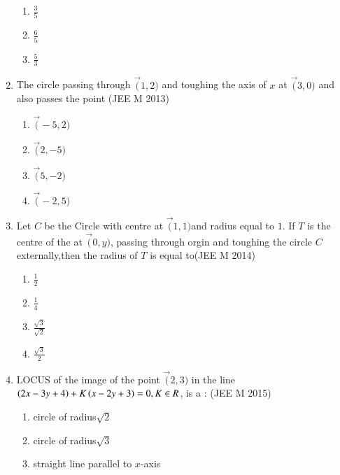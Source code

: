 \documentclass[journal,12pt,twocolumn]{IEEEtran}
\theoremstyle{remark}
\begin{document}
\begin{enumerate}
\begin{enumerate}
        \item$\frac{3}{5}$\\
        \item$\frac{6}{5}$\\
        \item$\frac{5}{3}$\\
    \end{enumerate}
    \item The circle passing through $\vec(1,2)$ and toughing the axis of $x$ at $\vec(3,0)$ and also passes the point
        \hfill(JEE M 2013)
    \begin{enumerate}
         \item$\vec(-5,2)$\\
         \item$\vec(2,-5)$\\
         \item$\vec(5,-2)$\\
         \item$\vec(-2,5)$\\
    \end{enumerate}
        \item Let $C$ be the Circle with centre at $\vec(1,1)$and radius equal to $1$. If $T$ is the centre of the at $\vec(0,y)$, passing through orgin and toughing the circle $C$ externally,then the radius of $T$ is equal to\hfill(JEE M 2014)
    \begin{enumerate}
        \item$\frac{1}{2}$\\
        \item$\frac{1}{4}$\\
        \item$\frac{\sqrt{3}}{\sqrt{2}}$\\
        \item$\frac{\sqrt{3}}{2}$\\
    \end{enumerate}
    \item LOCUS of the image of the point $\vec(2,3)$ in the line $\left(2x-3y+4\right)+K\left(x-2y+3\right)=0,K\in R$, is a :
        \hfill(JEE M 2015)
    \begin{enumerate}
         \item circle of radius${\sqrt{2}}$\\
         \item circle of radius${\sqrt{3}}$\\
         \item straight line parallel to $x$-axis\\

\end{enumerate}
\end{enumerate}
\end{document}
